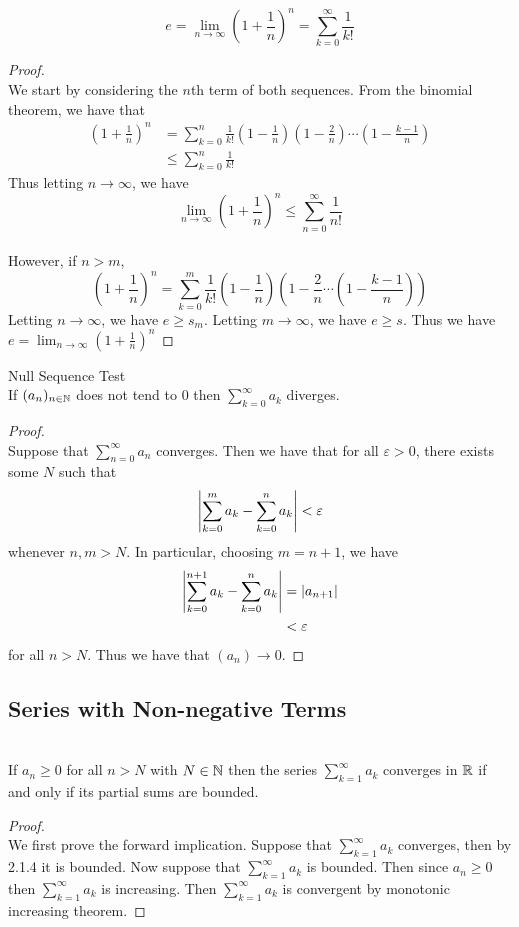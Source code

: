 \documentclass[a4paper]{article}
\begin{document}
\begin{prp}{}{}\\ $$e=\lim_{n\to\infty}\left(1+\frac{1}{n}\right)^n=\sum_{k=0}^{\infty}\frac{1}{k!}$$ 
\begin{proof}\\ We start by considering the $n$th term of both sequences. From the binomial theorem, we have that
\begin{align*}
\left(1+\frac{1}{n}\right)^n&=\sum_{k=0}^{n}\frac{1}{k!}\left(1-\frac{1}{n}\right)\left(1-\frac{2}{n}\right)\cdots\left(1-\frac{k-1}{n}\right)\\
&\leq\sum_{k=0}^{n}\frac{1}{k!}
\end{align*} Thus letting $n\to\infty$, we have $$\lim_{n\to\infty}\left(1+\frac{1}{n}\right)^n\leq\sum_{n=0}^{\infty}\frac{1}{n!}$$\\
However, if $n>m$, $$\left(1+\frac{1}{n}\right)^n=\sum_{k=0}^{m}\frac{1}{k!}\left(1-\frac{1}{n}\right)\left(1-\frac{2}{n}\cdots\left(1-\frac{k-1}{n}\right)\right)$$ Letting $n\to\infty$, we have $e\geq s_m$. Letting $m\to\infty$, we have $e\geq s$. Thus we have $e=\lim_{n\to\infty}\left(1+\frac{1}{n}\right)^n$
\end{proof}
\end{prp}

\begin{thm}{Null Sequence Test}{}\\ If $(a_n)_{n\in\mathbb{N}}$ does not tend to $0$ then $\sum_{k=0}^\infty a_k$ diverges. 
\begin{proof}\\ Suppose that $\sum_{n=0}^\infty a_n$ converges. Then we have that for all $\varepsilon>0$, there exists some $N$ such that $$\abs{\sum_{k=0}^m a_k-\sum_{k=0}^n a_k}<\varepsilon$$ whenever $n,m>N$. In particular, choosing $m=n+1$, we have
\begin{align*}
\abs{\sum_{k=0}^{n+1} a_k-\sum_{k=0}^n a_k}&=\abs{a_{n+1}}\\
&<\varepsilon
\end{align*} for all $n>N$. Thus we have that $(a_{n})\to 0$. 
\end{proof}
\end{thm}

\subsection{Series with Non-negative Terms}
\begin{thm}{}{}\\ If $a_n\geq 0 $ for all $n>N$ with $N\in\mathbb{N}$ then the series $\sum_{k=1}^\infty a_k$ converges in $\mathbb{R}$ if and only if its partial sums are bounded. 
\begin{proof}\\ We first prove the forward implication. Suppose that $\sum_{k=1}^\infty a_k$ converges, then by 2.1.4 it is bounded. Now suppose that $\sum_{k=1}^\infty a_k$ is bounded. Then since $a_n\geq0$ then $\sum_{k=1}^\infty a_k$ is increasing. Then $\sum_{k=1}^\infty a_k$ is convergent by monotonic increasing theorem. 
\end{proof}
\end{thm}
\end{document}
